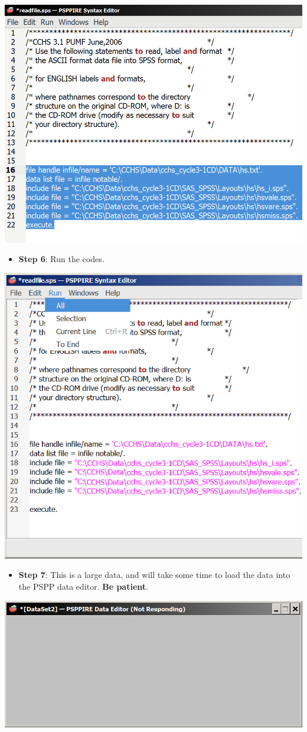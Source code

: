 \documentclass[
]{book}
\providecommand{\tightlist}{%
  \setlength{\itemsep}{0pt}\setlength{\parskip}{0pt}}
\begin{document}
\includegraphics[width=0.65\linewidth]{images/abacusX34}

\begin{itemize}
\tightlist
\item
  \textbf{Step 6}: Run the codes.
\end{itemize}

\includegraphics[width=0.65\linewidth]{images/abacus35}

\begin{itemize}
\tightlist
\item
  \textbf{Step 7}: This is a large data, and will take some time to load the data into the PSPP data editor. \textbf{Be patient}.
\end{itemize}

\includegraphics[width=0.65\linewidth]{images/waitX}
\end{document}
